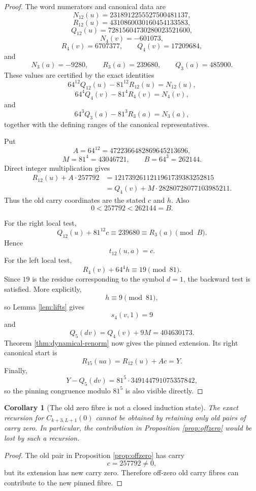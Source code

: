 \documentclass[11pt]{article}
\newtheorem{corollary}[theorem]{Corollary}
\theoremstyle{remark}
\begin{document}
\begin{proof}
The word numerators and canonical data are
\[
N_{12}(u)=2318912255527500481137,
\]
\[
R_{12}(u)=4310860030160454133583,
\]
\[
Q_{12}(u)=72815604730280023521600,
\]
\[
N_4(v)=-601073,
\]
\[
R_4(v)=6707377,
\qquad
Q_4(v)=17209684,
\]
and
\[
N_3(a)=-9280,
\qquad
R_3(a)=239680,
\qquad
Q_3(a)=485900.
\]
These values are certified by the exact identities
\[
64^{12}Q_{12}(u)-81^{12}R_{12}(u)=N_{12}(u),
\]
\[
64^4Q_4(v)-81^4R_4(v)=N_4(v),
\]
and
\[
64^3Q_3(a)-81^3R_3(a)=N_3(a),
\]
together with the defining ranges of the canonical representatives.

Put
\[
A=64^{12}=4722366482869645213696,
\]
\[
M=81^4=43046721,
\qquad
B=64^3=262144.
\]
Direct integer multiplication gives
\begin{align*}
R_{12}(u)+A\cdot257792
&=1217392611211961739383252815\\
&=Q_4(v)+M\cdot28280728077103985211.
\end{align*}
Thus the old carry coordinates are the stated $c$ and $h$.  Also
\[
0<257792<262144=B.
\]

For the right local test,
\[
Q_{12}(u)+81^{12}c
\equiv239680
\equiv R_3(a)
\pmod B.
\]
Hence
\[
t_{12}(u,a)=c.
\]
For the left local test,
\[
R_4(v)+64^4h\equiv19\pmod{81}.
\]
Since $19$ is the residue corresponding to the symbol $d=1$, the backward test is satisfied.  More explicitly,
\[
h\equiv9\pmod{81},
\]
so Lemma \ref{lem:lifts} gives
\[
s_4(v,1)=9
\]
and
\[
Q_5(dv)=Q_4(v)+9M=404630173.
\]
Theorem \ref{thm:dynamical-renorm} now gives the pinned extension.  Its right canonical start is
\[
R_{15}(ua)=R_{12}(u)+Ac=Y.
\]
Finally,
\[
Y-Q_5(dv)
=81^5\cdot349144791075357842,
\]
so the pinning congruence modulo $81^5$ is also visible directly.
\end{proof}

\begin{corollary}[The old zero fibre is not a closed induction state]
\label{cor:notclosed}
The exact recursion for $C_{k+3,L+1}(0)$ cannot be obtained by retaining only old pairs of carry zero.  In particular, the contribution in Proposition \ref{prop:offzero} would be lost by such a recursion.
\end{corollary}

\begin{proof}
The old pair in Proposition \ref{prop:offzero} has carry
\[
c=257792\ne0,
\]
but its extension has new carry zero.  Therefore off-zero old carry fibres can contribute to the new pinned fibre.
\end{proof}
\end{document}

